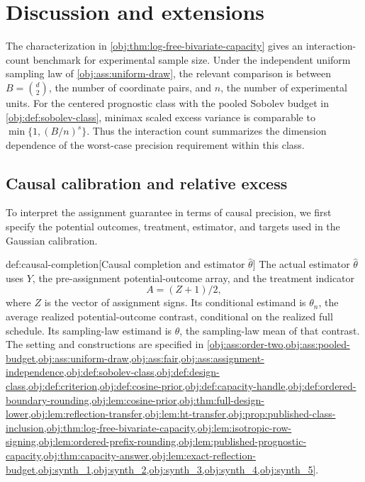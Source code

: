 \documentclass[11pt]{article}
\begin{document}
\section{Discussion and extensions}

The characterization in \cref{obj:thm:log-free-bivariate-capacity} gives an interaction-count benchmark for experimental sample size. Under the independent uniform sampling law of \cref{obj:ass:uniform-draw}, the relevant comparison is between \(B=\binom d2\), the number of coordinate pairs, and \(n\), the number of experimental units. For the centered prognostic class with the pooled Sobolev budget in \cref{obj:def:sobolev-class}, minimax scaled excess variance is comparable to \(\min\{1,(B/n)^s\}\). Thus the interaction count summarizes the dimension dependence of the worst-case precision requirement within this class.

\subsection{Causal calibration and relative excess}

To interpret the assignment guarantee in terms of causal precision, we first specify the potential outcomes, treatment, estimator, and targets used in the Gaussian calibration.

\begin{definitionv}{def:causal-completion}[Causal completion and estimator \(\widehat\theta\)]
The actual estimator \(\widehat\theta\) uses \(Y\), the pre-assignment potential-outcome array, and the treatment indicator
\[
A=(Z+1)/2,
\]
where \(Z\) is the vector of assignment signs. Its conditional estimand is \(\theta_n\), the average realized potential-outcome contrast, conditional on the realized full schedule. Its sampling-law estimand is \(\theta\), the sampling-law mean of that contrast. The setting and constructions are specified in \cref{obj:ass:order-two,obj:ass:pooled-budget,obj:ass:uniform-draw,obj:ass:fair,obj:ass:assignment-independence,obj:def:sobolev-class,obj:def:design-class,obj:def:criterion,obj:def:cosine-prior,obj:def:capacity-handle,obj:def:ordered-boundary-rounding,obj:lem:cosine-prior,obj:thm:full-design-lower,obj:lem:reflection-transfer,obj:lem:ht-transfer,obj:prop:published-class-inclusion,obj:thm:log-free-bivariate-capacity,obj:lem:isotropic-row-signing,obj:lem:ordered-prefix-rounding,obj:lem:published-prognostic-capacity,obj:thm:capacity-answer,obj:lem:exact-reflection-budget,obj:synth_1,obj:synth_2,obj:synth_3,obj:synth_4,obj:synth_5}.
\end{definitionv}
\end{document}
